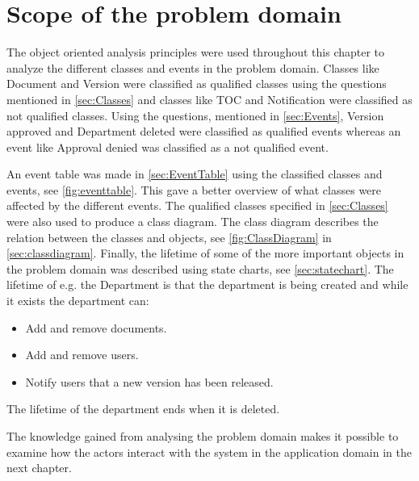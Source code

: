 \section{Scope of the problem domain}
The object oriented analysis principles were used throughout this chapter to analyze the different classes and events in the problem domain.
Classes like Document and Version were classified as qualified classes using the questions mentioned in \cref{sec:Classes} and classes like TOC and Notification were classified as not qualified classes.
Using the questions, mentioned in \cref{sec:Events}, Version approved and Department deleted were classified as qualified events whereas an event like Approval denied was classified as a not qualified event.

An event table was made in \cref{sec:EventTable} using the classified classes and events, see \cref{fig:eventtable}.
This gave a better overview of what classes were affected by the different events.
The qualified classes specified in \cref{sec:Classes} were also used to produce a class diagram.
The class diagram describes the relation between the classes and objects, see \cref{fig:ClassDiagram} in \cref{sec:classdiagram}.
Finally, the lifetime of some of the more important objects in the problem domain was described using state charts, see \cref{sec:statechart}.
The lifetime of e.g. the Department is that the department is being created and while it exists the department can:

\begin{itemize}
	\item Add and remove documents.
	\item Add and remove users.
	\item Notify users that a new version has been released.
\end{itemize}

The lifetime of the department ends when it is deleted.

The knowledge gained from analysing the problem domain makes it possible to examine how the actors interact with the system in the application domain in the next chapter.
